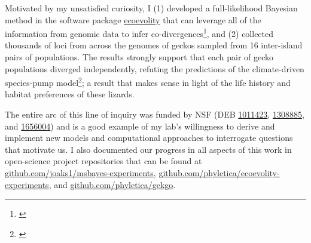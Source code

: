 Motivated by my unsatisfied curiosity, I
(1) developed a full-likelihood Bayesian method in the software package
\href{http://phyletica.org/ecoevolity/}{ecoevolity}
that can leverage all of the information from genomic data to infer
co-divergences\footnote{\label{Oaks18ecoevolity}},
and
(2) collected thousands of loci from across the genomes of geckos sampled from
16 inter-island pairs of populations.
The results strongly support that each pair of gecko populations diverged
independently, refuting the predictions of the climate-driven species-pump
model\footnote{\label{Oaks18paic}};
a result that makes sense in light of the life history and habitat
preferences of these lizards.

The entire arc of this line of inquiry was funded by NSF
(DEB
\href{https://www.nsf.gov/awardsearch/showAward?AWD_ID=1011423}{1011423},
\href{https://www.nsf.gov/awardsearch/showAward?AWD_ID=1308885}{1308885},
and
\href{https://www.nsf.gov/awardsearch/showAward?AWD_ID=1656004}{1656004})
and is a good example of my lab's willingness to derive and implement new
models and computational approaches to interrogate questions that motivate us.
I also documented our progress in all aspects of this work in open-science
project repositories that can be found at
\href{https://github.com/joaks1/msbayes-experiments}{github.com/joaks1/msbayes-experiments},
\href{https://github.com/phyletica/ecoevolity-experiments}{github.com/phyletica/ecoevolity-experiments},
and
\href{https://github.com/phyletica/gekgo}{github.com/phyletica/gekgo}.







